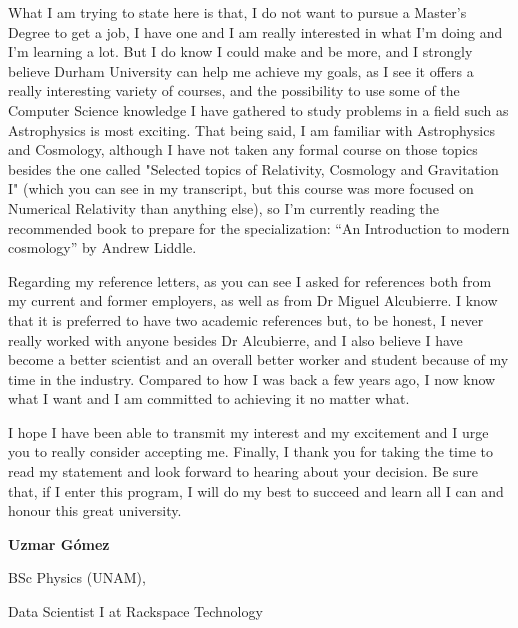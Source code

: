 \documentclass{article}
\begin{document}
What I am trying to state here is that, I do not want to pursue a Master's Degree to get a job, I have one and I am really interested in what I'm doing and I'm learning a lot. But I do know I could make and be more, and I strongly believe Durham University can help me achieve my goals, as I see it offers a really interesting variety of courses, and the possibility to use some of the Computer Science knowledge I have gathered to study problems in a field such as Astrophysics is most exciting. That being said, I am familiar with Astrophysics and Cosmology, although I have not taken any formal course on those topics besides the one called "Selected topics of Relativity, Cosmology and Gravitation I" (which you can see in my transcript, but this course was more focused on Numerical Relativity than anything else), so I'm currently reading the recommended book to prepare for the specialization: ``An Introduction to modern cosmology'' by Andrew Liddle.

Regarding my reference letters, as you can see I asked for references both from my current and former employers, as well as from Dr Miguel Alcubierre. I know that it is preferred to have two academic references but, to be honest, I never really worked with anyone besides Dr Alcubierre, and I also believe I have become a better scientist and an overall better worker and student because of my time in the industry. Compared to how I was back a few years ago, I now know what I want and I am committed to achieving it no matter what.

I hope I have been able to transmit my interest and my excitement and I urge you to really consider accepting me. Finally, I thank you for taking the time to read my statement and look forward to hearing about your decision. Be sure that, if I enter this program, I will do my best to succeed and learn all I can and honour this great university.

\vspace{4cm}
\hfill \textbf{Uzmar Gómez}

\hfill BSc Physics (UNAM), 

\hfill Data Scientist I at Rackspace Technology
\end{document}

